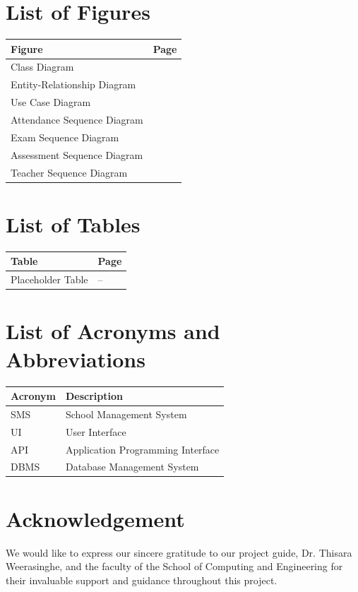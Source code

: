 \documentclass[12pt,a4paper]{report}
\begin{document}
\section*{List of Figures}
\begin{longtable}{p{}p{}}
    Figure & Page \\
    \hline
    Class Diagram & \pageref{fig:class-diagram} \\
    Entity-Relationship Diagram & \pageref{fig:er-diagram} \\
    Use Case Diagram & \pageref{fig:use-case-diagram} \\
    Attendance Sequence Diagram & \pageref{fig:attendance-sequence} \\
    Exam Sequence Diagram & \pageref{fig:exam-sequence} \\
    Assessment Sequence Diagram & \pageref{fig:assessment-sequence} \\
    Teacher Sequence Diagram & \pageref{fig:teacher-sequence} \\
\end{longtable}

\section*{List of Tables}
\begin{longtable}{p{}p{}}
    Table & Page \\
    \hline
    Placeholder Table & -- \\
\end{longtable}

\section*{List of Acronyms and Abbreviations}
\begin{longtable}{p{}p{}}
    Acronym & Description \\
    \hline
    SMS & School Management System \\
    UI & User Interface \\
    API & Application Programming Interface \\
    DBMS & Database Management System \\
\end{longtable}

\section*{Acknowledgement}
We would like to express our sincere gratitude to our project guide, Dr. Thisara Weerasinghe, and the faculty of the School of Computing and Engineering for their invaluable support and guidance throughout this project.
\end{document}
